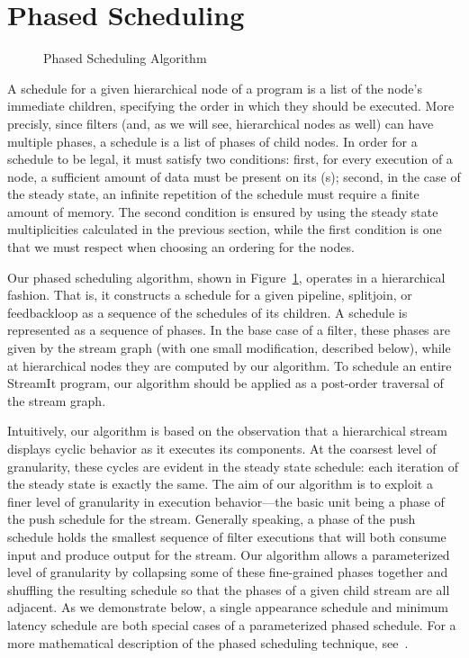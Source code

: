 \section{Phased Scheduling}
\label{chpt:phased}

\begin{figure}[t]
\caption{Phased Scheduling Algorithm\protect\label{fig:alg}}
\end{figure}

A schedule for a given hierarchical node of a {\StreamIt} program is a
list of the node's immediate children, specifying the order in which
they should be executed.  More precisly, since filters (and, as we
will see, hierarchical nodes as well) can have multiple phases, a
schedule is a list of phases of child nodes.  In order for a schedule
to be legal, it must satisfy two conditions: first, for every
execution of a node, a sufficient amount of data must be present on
its {\Input} {\Channel}(s); second, in the case of the steady state,
an infinite repetition of the schedule must require a finite amount of
memory.  The second condition is ensured by using the steady state
multiplicities calculated in the previous section, while the first
condition is one that we must respect when choosing an ordering for
the nodes.

Our phased scheduling algorithm, shown in Figure~\ref{fig:alg},
operates in a hierarchical fashion.  That is, it constructs a schedule
for a given pipeline, splitjoin, or feedbackloop as a sequence of the
schedules of its children.  A schedule is represented as a sequence of
phases.  In the base case of a filter, these phases are given by the
stream graph (with one small modification, described below), while at
hierarchical nodes they are computed by our algorithm.  To schedule an
entire StreamIt program, our algorithm should be applied as a
post-order traversal of the stream graph.

Intuitively, our algorithm is based on the observation that a
hierarchical stream displays cyclic behavior as it executes its
components.  At the coarsest level of granularity, these cycles are
evident in the steady state schedule: each iteration of the steady
state is exactly the same.  The aim of our algorithm is to exploit a
finer level of granularity in execution behavior---the basic unit
being a phase of the push schedule for the stream.  Generally
speaking, a phase of the push schedule holds the smallest sequence of
filter executions that will both consume input and produce output for
the stream.  Our algorithm allows a parameterized level of granularity
by collapsing some of these fine-grained phases together and shuffling
the resulting schedule so that the phases of a given child stream are
all adjacent.  As we demonstrate below, a single appearance schedule
and minimum latency schedule are both special cases of a parameterized
phased schedule.  For a more mathematical description of the phased
scheduling technique, see~\cite{karczma-thesis}.

